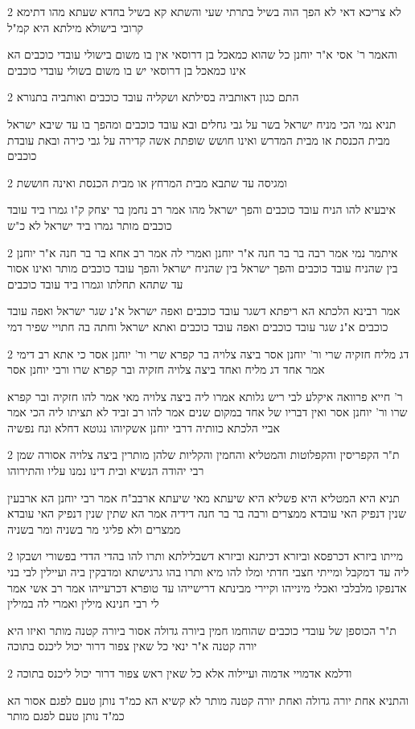 \documentclass[12pt, openany]{book}
\newcommand{\sethebfont}{
\fontsize{10.5pt}{21.0pt} \selectfont
}
\newcommand{\twocol}[1]{
	{\sethebfont \begin{multicols}{2}
			#1
	\end{multicols}}	
}
\begin{document}
\twocol{לא צריכא דאי לא הפך הוה בשיל בתרתי שעי והשתא קא בשיל בחדא שעתא מהו דתימא קרובי בישולא מילתא היא קמ"ל
\par והאמר ר' אסי א"ר יוחנן כל שהוא כמאכל בן דרוסאי אין בו משום בישולי עובדי כוכבים הא אינו כמאכל בן דרוסאי יש בו משום בשולי עובדי כוכבים}
\twocol{התם כגון דאותביה בסילתא ושקליה עובד כוכבים ואותביה בתנורא
\par תניא נמי הכי מניח ישראל בשר על גבי גחלים ובא עובד כוכבים ומהפך בו עד שיבא ישראל מבית הכנסת או מבית המדרש ואינו חושש שופתת אשה קדירה על גבי כירה ובאת עובדת כוכבים}
\twocol{ומגיסה עד שתבא מבית המרחץ או מבית הכנסת ואינה חוששת
\par איבעיא להו הניח עובד כוכבים והפך ישראל מהו אמר רב נחמן בר יצחק ק"ו גמרו ביד עובד כוכבים מותר גמרו ביד ישראל לא כ"ש}
\twocol{איתמר נמי אמר רבה בר בר חנה א"ר יוחנן ואמרי לה אמר רב אחא בר בר חנה א"ר יוחנן בין שהניח עובד כוכבים והפך ישראל בין שהניח ישראל והפך עובד כוכבים מותר ואינו אסור עד שתהא תחלתו וגמרו ביד עובד כוכבים
\par אמר רבינא הלכתא הא ריפתא דשגר עובד כוכבים ואפה ישראל א"נ שגר ישראל ואפה עובד כוכבים א"נ שגר עובד כוכבים ואפה עובד כוכבים ואתא ישראל וחתה בה חתויי שפיר דמי}
\twocol{דג מליח חזקיה שרי ור' יוחנן אסר ביצה צלויה בר קפרא שרי ור' יוחנן אסר כי אתא רב דימי אמר אחד דג מליח ואחד ביצה צלויה חזקיה ובר קפרא שרו ורבי יוחנן אסר
\par ר' חייא פרוואה איקלע לבי ריש גלותא אמרו ליה ביצה צלויה מאי אמר להו חזקיה ובר קפרא שרו ור' יוחנן אסר ואין דבריו של אחד במקום שנים אמר להו רב זביד לא תציתו ליה הכי אמר אביי הלכתא כוותיה דרבי יוחנן אשקיוהו נגוטא דחלא ונח נפשיה}
\twocol{ת"ר הקפריסין והקפלוטות והמטליא והחמין והקליות שלהן מותרין ביצה צלויה אסורה שמן רבי יהודה הנשיא ובית דינו נמנו עליו והתירוהו
\par תניא היא המטליא היא פשליא היא שיעתא מאי שיעתא ארבב"ח אמר רבי יוחנן הא ארבעין שנין דנפיק האי עובדא ממצרים ורבה בר בר חנה דידיה אמר הא שתין שנין דנפיק האי עובדא ממצרים ולא פליגי מר בשניה ומר בשניה}
\twocol{מייתו ביזרא דכרפסא וביזרא דכיתנא וביזרא דשבלילתא ותרו להו בהדי הדדי בפשורי ושבקו ליה עד דמקבל ומייתי חצבי חדתי ומלו להו מיא ותרו בהו גרגישתא ומדבקין ביה ועיילין לבי בני אדנפקו מלבלבי ואכלי מינייהו וקיירי מבינתא דרישייהו עד טופרא דכרעייהו אמר רב אשי אמר לי רבי חנינא מילין ואמרי לה במילין
\par ת"ר הכוספן של עובדי כוכבים שהוחמו חמין ביורה גדולה אסור ביורה קטנה מותר ואיזו היא יורה קטנה א"ר ינאי כל שאין צפור דרור יכול ליכנס בתוכה}
\twocol{ודלמא אדמויי אדמוה ועיילוה אלא כל שאין ראש צפור דרור יכול ליכנס בתוכה
\par והתניא אחת יורה גדולה ואחת יורה קטנה מותר לא קשיא הא כמ"ד נותן טעם לפגם אסור הא כמ"ד נותן טעם לפגם מותר}
\end{document}
